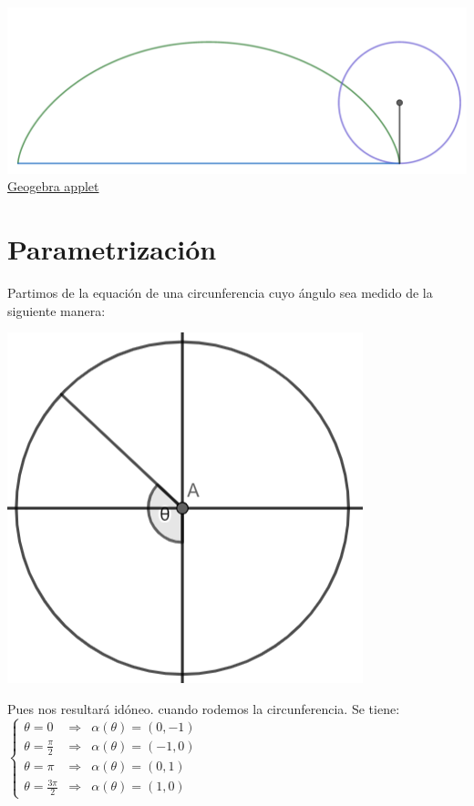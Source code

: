 \documentclass{article}
\begin{document}
\begin{center}
\begin{align*}
\end{align*}
\includegraphics[scale=0.4]{figuras/cicloide descipcion 5.PNG}\\
\href{https://www.geogebra.org/calculator/ju6wnwpc}{Geogebra applet}
\end{center}
\newpage\section{Parametrización}
Partimos de la equación de una circunferencia cuyo ángulo sea medido de la siguiente manera:
\begin{center}
        \includegraphics[scale=0.4]{figuras/circulo angulo.PNG}
\end{center} Pues nos resultará idóneo. cuando rodemos la circunferencia. Se tiene:\\
$\left\{\begin{array}{lll}
    \theta = 0 & \Rightarrow & \alpha(\theta)=(0,-1) \\
    \theta = \frac{\pi}{2} & \Rightarrow & \alpha(\theta)=(-1,0) \\
    \theta = \pi & \Rightarrow & \alpha(\theta)=(0,1) \\
    \theta = \frac{3\pi}{2} & \Rightarrow & \alpha(\theta)=(1,0)
\end{array}\right.$
\end{document}
